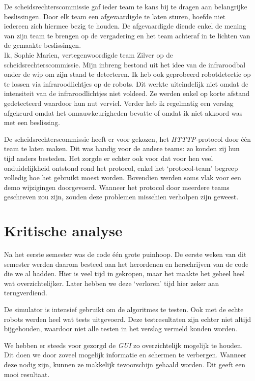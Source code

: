 \documentclass[eind]{penoverslag}
\begin{document}
De scheidsrechterscommissie gaf ieder team te kans bij te dragen aan belangrijke beslissingen. Door elk team een afgevaardigde te laten sturen, hoefde niet iedereen zich hiermee bezig te houden. De afgevaardigde diende enkel de mening van zijn team te brengen op de vergadering en het team achteraf in te lichten van de gemaakte beslissingen.\\

Ik, Sophie Marien, vertegenwoordigde team Zilver op de scheidsrechterscommissie. Mijn inbreng bestond uit het idee van de infraroodbal onder de wip om zijn stand te detecteren. Ik heb ook geprobeerd robotdetectie op te lossen via infraroodlichtjes op de robots. Dit werkte uiteindelijk niet omdat de intensiteit van de infraroodlichtjes niet voldeed. Ze werden enkel op korte afstand gedetecteerd waardoor hun nut verviel.
Verder heb ik regelmatig een verslag afgekeurd omdat het onnauwkeurigheden bevatte of omdat ik niet akkoord was met een beslissing.

De scheidsrechterscommissie heeft er voor gekozen, het \textit{HTTTP}-protocol door \'e\'en team te laten maken. Dit was handig voor de andere teams: zo konden zij hun tijd anders besteden. Het zorgde er echter ook voor dat voor hen veel onduidelijkheid ontstond rond het protocol, enkel het `protocol-team' begreep volledig hoe het gebruikt moest worden. Bovendien werden soms vlak voor een demo wijzigingen doorgevoerd. Wanneer het protocol door meerdere teams geschreven zou zijn, zouden deze problemen misschien verholpen zijn geweest.

\section{Kritische analyse}
\label{Asec:kritisch}

Na het eerste semester was de code \'e\'en grote puinhoop. De eerste weken van dit semester werden daarom besteed aan het herordenen en herschrijven van de code die we al hadden. Hier is veel tijd in gekropen, maar het maakte het geheel heel wat overzichtelijker. Later hebben we deze `verloren' tijd hier zeker aan terugverdiend.

De simulator is intensief gebruikt om de algoritmes te testen. Ook met de echte robots werden heel wat tests uitgevoerd. Deze testresultaten zijn echter niet altijd bijgehouden, waardoor niet alle testen in het verslag vermeld konden worden.

We hebben er steeds voor gezorgd de \textit{GUI} zo overzichtelijk mogelijk te houden. Dit doen we door zoveel mogelijk informatie en schermen te verbergen. Wanneer deze nodig zijn, kunnen ze makkelijk tevoorschijn gehaald worden. Dit geeft een mooi resultaat.
\end{document}
